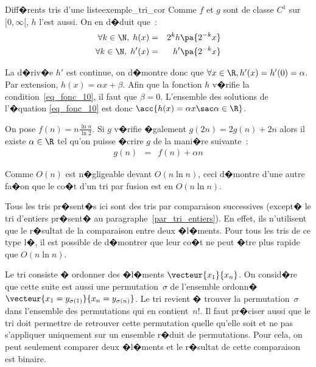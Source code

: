 \begin{xexempleprog2}{Diff�rents tris d'une liste}{exemple_tri_cor}
Comme $f$ et $g$ sont de classe $C^1$ sur $[0, \infty[$, $h$ l'est aussi. On en d�duit que~:
\begin{eqnarray}
\forall k \in \N, \; h(x) &=& 2^k h \pa{2^{-k}x} \\
\forall k \in \N, \; h'(x) &=& h' \pa{2^{-k}x} 
\end{eqnarray}

La d�riv�e $h'$ est continue, on d�montre donc que $\forall x \in \R, h'(x) = h'(0)= \alpha$. Par extension, $h(x) = \alpha x + \beta$. Afin que la fonction $h$ v�rifie la condition~\ref{eq_fonc_10}, il faut que $\beta = 0$. L'ensemble des solutions de l'�quation \ref{eq_fonc_10} est donc $\acc{ h(x) = \alpha x \sac \alpha \in \R }$.

On pose $f(n) = n \frac{\ln n}{\ln 2}$. Si $g$ v�rifie �galement $g(2n) = 2 g(n) + 2n$ alors il existe $\alpha \in \R$ tel qu'on puisse �crire $g$ de la mani�re suivante~:
\begin{eqnarray}
g(n) &=& f(n) + \alpha n
\end{eqnarray}

Comme $O(n)$ est n�gligeable devant $O (n \ln n)$, ceci d�montre d'une autre fa�on que le co�t d'un tri par fusion est en $O(n \ln n)$.

  \label{tri_cost_minimal_2}

Tous les tris pr�sent�s ici sont des tris par comparaison successives (except� le tri d'entiers pr�sent� au paragraphe~\ref{par_tri_entiers}).  En effet, ils n'utilisent que le r�sultat de la comparaison entre deux �l�ments. Pour tous les tris de ce type l�, il est possible de d�montrer que leur co�t ne peut �tre plus rapide que $O(n \ln n)$.

Le tri consiste � ordonner des �l�ments $\vecteur{x_1}{x_n}$. On consid�re que cette suite est aussi une permutation~$\sigma$ de l'ensemble ordonn� $\vecteur{x_1=y_{\sigma(1)}}{x_n=y_{\sigma(n)}}$. Le tri revient � trouver la permutation~$\sigma$ dans l'ensemble des permutations qui en contient~$n!$. Il faut pr�ciser aussi que le tri doit permettre de retrouver cette permutation quelle qu'elle soit et ne pas s'appliquer uniquement sur un ensemble r�duit de permutations. Pour cela, on peut seulement comparer deux �l�ments et le r�sultat de cette comparaison est binaire. 


\end{xexempleprog2}
